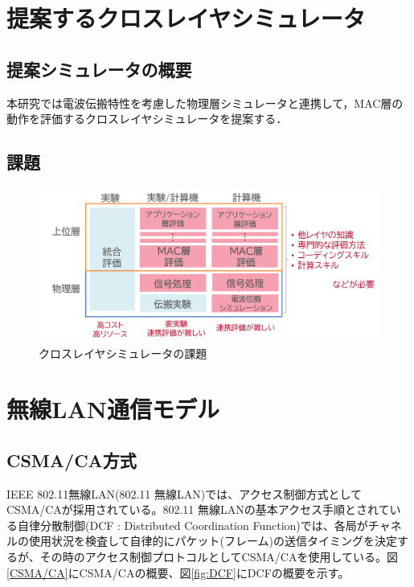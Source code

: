 \documentclass[a4paper,10pt]{ltjsarticle}
\begin{document}

\clearpage
\section{提案するクロスレイヤシミュレータ}
\subsection{提案シミュレータの概要}
本研究では電波伝搬特性を考慮した物理層シミュレータと連携して，MAC層の動作を評価するクロスレイヤシミュレータを提案する．

\subsection{課題}

\begin{figure}[H]
  \centering
  \includegraphics[width=\textwidth]{./assets/課題.png}
  \caption{クロスレイヤシミュレータの課題}
  \label{fig:problem}
\end{figure}


\clearpage
\section{無線LAN通信モデル}

\subsection{CSMA/CA方式}


IEEE 802.11無線LAN(802.11 無線LAN)では、アクセス制御方式としてCSMA/CAが採用されている。802.11 無線LANの基本アクセス手順とされている自律分散制御(DCF : Distributed Coordination Function)では、各局がチャネルの使用状況を検査して自律的にパケット(フレーム)の送信タイミングを決定するが、その時のアクセス制御プロトコルとしてCSMA/CAを使用している。図\ref{CSMA/CA}にCSMA/CAの概要、図\ref{fig:DCF}にDCFの概要を示す。
\end{document}
